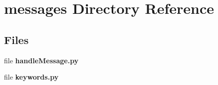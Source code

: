 \section{messages Directory Reference}
\label{dir_b8f7637664a38e012eb6b40bd154637c}
\subsection*{Files}
\begin{DoxyCompactItemize}
\item 
file {\bf handle\+Message.\+py}
\item 
file {\bf keywords.\+py}
\end{DoxyCompactItemize}
